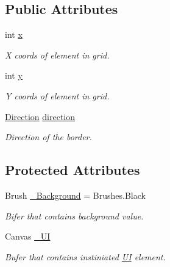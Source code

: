\subsection*{Public Attributes}
\begin{DoxyCompactItemize}
\item 
int \mbox{\hyperlink{class_wpf_handler_1_1_u_i_1_1_controls_1_1_selectable_grid_1_1_active_border_afcdf419ca5d65ebdc7537bc904de9abe}{x}}
\begin{DoxyCompactList}\small\item\em X coords of element in grid. \end{DoxyCompactList}\item 
int \mbox{\hyperlink{class_wpf_handler_1_1_u_i_1_1_controls_1_1_selectable_grid_1_1_active_border_a839130eb090181639e99364db0d33632}{y}}
\begin{DoxyCompactList}\small\item\em Y coords of element in grid. \end{DoxyCompactList}\item 
\mbox{\hyperlink{class_wpf_handler_1_1_u_i_1_1_controls_1_1_selectable_grid_1_1_active_border_af87f3f6373b404c7f93985a70fffd8f0}{Direction}} \mbox{\hyperlink{class_wpf_handler_1_1_u_i_1_1_controls_1_1_selectable_grid_1_1_active_border_a0ffada4340264d67f4f212257cc9ec35}{direction}}
\begin{DoxyCompactList}\small\item\em Direction of the border. \end{DoxyCompactList}\end{DoxyCompactItemize}
\subsection*{Protected Attributes}
\begin{DoxyCompactItemize}
\item 
Brush \mbox{\hyperlink{class_wpf_handler_1_1_u_i_1_1_controls_1_1_selectable_grid_1_1_active_border_ad0551d7ab4a4fcd1a6a703a0bb4666a8}{\+\_\+\+Background}} = Brushes.\+Black
\begin{DoxyCompactList}\small\item\em Bifer that contains background value. \end{DoxyCompactList}\item 
Canvas \mbox{\hyperlink{class_wpf_handler_1_1_u_i_1_1_controls_1_1_selectable_grid_1_1_active_border_a6650edd577dccb9d3d78cde5893c0e71}{\+\_\+\+UI}}
\begin{DoxyCompactList}\small\item\em Bufer that contains instiniated \mbox{\hyperlink{namespace_wpf_handler_1_1_u_i}{UI}} element. \end{DoxyCompactList}\end{DoxyCompactItemize}

